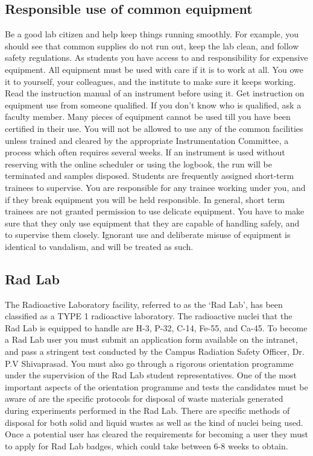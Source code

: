 \documentclass[a4paper,10pt]{article}
\begin{document}
\subsection{Responsible use of common equipment}
Be a good lab citizen and help keep things
running smoothly. For example, you should see that common supplies do not run out, keep
the lab clean, and follow safety regulations. As students you have access to and
responsibility for expensive equipment. All equipment must be used with care if it is to work
at all. You owe it to yourself, your colleagues, and the institute to make sure it keeps
working. Read the instruction manual of an instrument before using it. Get instruction on
equipment use from someone qualified. If you don't know who is qualified, ask a faculty
member. Many pieces of equipment cannot be used till you have been certified in their use.
You will not be allowed to use any of the common facilities unless trained and cleared by
the appropriate Instrumentation Committee, a process which often requires several weeks. If
an instrument is used without reserving with the online scheduler or using the logbook, the
run will be terminated and samples disposed. Students are frequently assigned short-term
trainees to supervise. You are responsible for any trainee working under you, and if they
break equipment you will be held responsible. In general, short term trainees are not granted
permission to use delicate equipment. You have to make sure that they only use equipment
that they are capable of handling safely, and to supervise them closely. Ignorant use and
deliberate misuse of equipment is identical to vandalism, and will be treated as such.

\subsection{Rad Lab}
The Radioactive Laboratory facility, referred to as the ‘Rad Lab’, has been
classified as a TYPE 1 radioactive laboratory. The radioactive nuclei that the Rad Lab is
equipped to handle are H-3, P-32, C-14, Fe-55, and Ca-45. To become a Rad Lab user you
must submit an application form available on the intranet, and pass a stringent test
conducted by the Campus Radiation Safety Officer, Dr. P.V Shivaprasad. You must also go
through a rigorous orientation programme under the supervision of the Rad Lab student
representatives. One of the most important aspects of the orientation programme and tests
the candidates must be aware of are the specific protocols for disposal of waste materials
generated during experiments performed in the Rad Lab. There are specific methods of
disposal for both solid and liquid wastes as well as the kind of nuclei being used. Once a
potential user has cleared the requirements for becoming a user they must to apply for Rad
Lab badges, which could take between 6-8 weeks to obtain.
\end{document}
